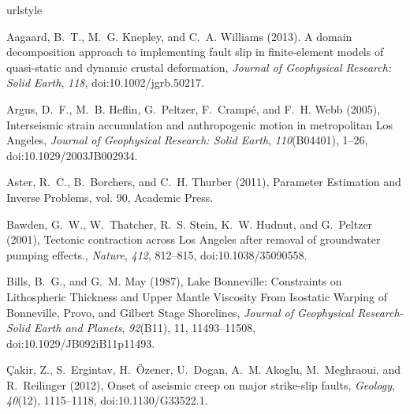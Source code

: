 \documentclass[draft,linenumbers]{AGUJournal}
\begin{document}
%
\begin{thebibliography}{52}
\providecommand{\natexlab}[1]{#1}
\expandafter\ifx\csname urlstyle\endcsname\relax
  \providecommand{\doi}[1]{doi:\discretionary{}{}{}#1}\else
  \providecommand{\doi}{doi:\discretionary{}{}{}\begingroup
  \urlstyle{rm}\Url}\fi

Aagaard, B.~T., M.~G. Knepley, and C.~A. Williams (2013). {A domain decomposition approach to implementing
fault slip in finite-element models of quasi-static and dynamic crustal deformation}, \textit{Journal of Geophysical
Research: Solid Earth}, \textit{118}, \doi{10.1002/jgrb.50217}.  
  
Argus, D.~F., M.~B. Heflin, G.~Peltzer, F.~Cramp{\'{e}}, and F.~H. Webb (2005), {Interseismic strain accumulation and anthropogenic motion in metropolitan Los Angeles}, \textit{Journal of Geophysical Research: Solid Earth}, \textit{110}(B04401), 1--26, \doi{10.1029/2003JB002934}.

Aster, R.~C., B.~Borchers, and C.~H. Thurber (2011), {Parameter Estimation and Inverse Problems}, vol. 90, Academic Press.
  
Bawden, G.~W., W.~Thatcher, R.~S. Stein, K.~W. Hudnut, and G.~Peltzer (2001), {Tectonic contraction across Los Angeles after removal of groundwater pumping effects.}, \textit{Nature}, \textit{412}, 812--815, \doi{10.1038/35090558}.

Bills, B.~G., and G.~M. May (1987), {Lake Bonneville: Constraints on Lithospheric Thickness and Upper Mantle Viscosity From Isostatic Warping of Bonneville, Provo, and Gilbert Stage Shorelines}, \textit{Journal of Geophysical Research-Solid Earth and Planets}, \textit{92}(B11), 11, 11493--11508, \doi{10.1029/JB092iB11p11493}.

{\c{C}}akir, Z., S.~Ergintav, H.~{\"{O}}zener, U.~Dogan, A.~M. Akoglu, M.~Meghraoui, and R.~Reilinger (2012), {Onset of aseismic creep on major strike-slip faults}, \textit{Geology}, \textit{40}(12), 1115--1118, \doi{10.1130/G33522.1}.
  

\end{thebibliography}
\end{document}
